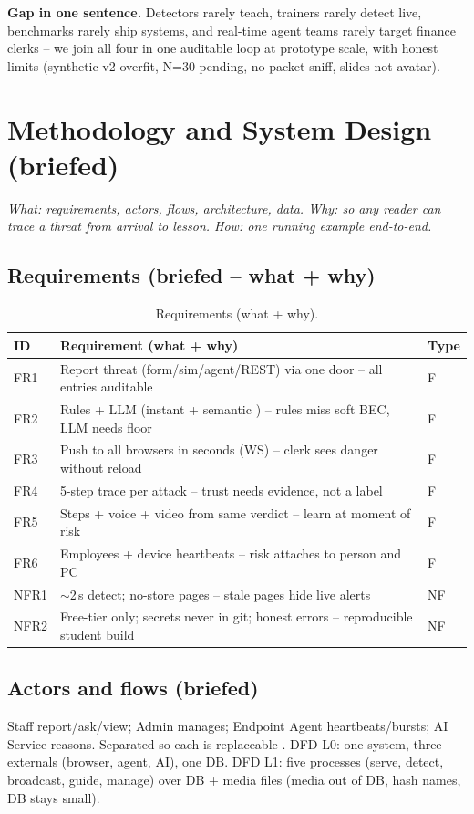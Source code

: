 \documentclass[11pt,a4paper]{article}
\begin{document}
\noindent\textbf{Gap in one sentence.} Detectors rarely teach, trainers rarely detect live, benchmarks rarely ship systems, and real-time agent teams rarely target finance clerks -- we join all four in one auditable loop at prototype scale, with honest limits (synthetic v2 overfit, N=30 pending, no packet sniff, slides-not-avatar).

\section{Methodology and System Design (briefed)}
\noindent\textit{What: requirements, actors, flows, architecture, data. Why: so any reader can trace a threat from arrival to lesson. How: one running example end-to-end.}

\subsection{Requirements (briefed -- what + why)}
\begin{table}[h]\centering\caption{Requirements (what + why).}\label{tab:req}\begin{tabular}{@{}lp{9.5cm}l@{}}\toprule ID & Requirement (what + why) & Type\\\midrule
FR1 & Report threat (form/sim/agent/REST) via one door -- all entries auditable & F\\
FR2 & Rules + LLM (instant + semantic \cite{Nair25,Algo25}) -- rules miss soft BEC, LLM needs floor & F\\
FR3 & Push to all browsers in seconds (WS) -- clerk sees danger without reload & F\\
FR4 & 5-step trace per attack -- trust needs evidence, not a label \cite{Koide24,Desolda24} & F\\
FR5 & Steps + voice + video from same verdict -- learn at moment of risk \cite{SchoniCHI25,TrainShield25} & F\\
FR6 & Employees + device heartbeats -- risk attaches to person and PC & F\\
NFR1 & $\sim$2\,s detect; no-store pages -- stale pages hide live alerts & NF\\
NFR2 & Free-tier only; secrets never in git; honest errors -- reproducible student build & NF\\\bottomrule\end{tabular}\end{table}

\subsection{Actors and flows (briefed)}
Staff report/ask/view; Admin manages; Endpoint Agent heartbeats/bursts; AI Service reasons. Separated so each is replaceable \cite{AutoGen24}. DFD L0: one system, three externals (browser, agent, AI), one DB. DFD L1: five processes (serve, detect, broadcast, guide, manage) over DB + media files (media out of DB, hash names, DB stays small).
\end{document}
